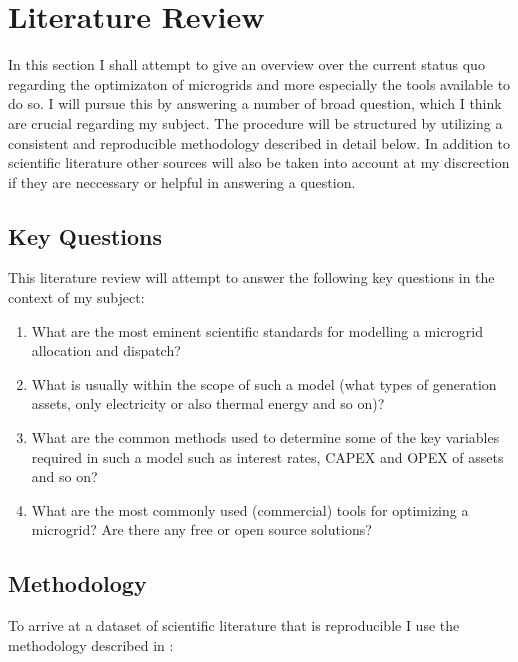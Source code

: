 \documentclass[
	11pt,								%
	DIV10,								%
	a4paper,         					%
	oneside,							%
	headheight=20pt,					%
	footheight=20pt,					%
    parskip=full,						%
    listof=totoc,						%
	bibliography=totoc,					%
	index=totoc,						%
]{scrartcl}
\begin{document}

\newpage

\section{Literature Review}
In this section I shall attempt to give an overview over the current status quo regarding the optimizaton of microgrids and more especially the tools available to do so. I will pursue  this by answering a number of broad question, which I think are crucial regarding my subject. The procedure will be structured by utilizing a consistent and reproducible methodology described in detail below. In addition to scientific literature other sources will also be taken into account at my discrection if they are neccessary or helpful in answering a question.

\subsection{Key Questions}
This literature review will attempt to answer the following key questions in the context of my subject:
\begin{enumerate}
	\item What are the most eminent scientific standards for modelling a microgrid allocation and dispatch?
	\item What is usually within the scope of such a model (what types of generation assets, only electricity or also thermal energy and so on)? 
	\item What are the common methods used to determine some of the key variables required in such a model such as interest rates, CAPEX and OPEX of assets and so on?
	\item What are the most commonly used (commercial) tools for optimizing a microgrid? Are there any free or open source solutions? 
\end{enumerate} 

\subsection{Methodology}
To arrive at a dataset of scientific literature that is reproducible I use the methodology described in :
\end{document}
